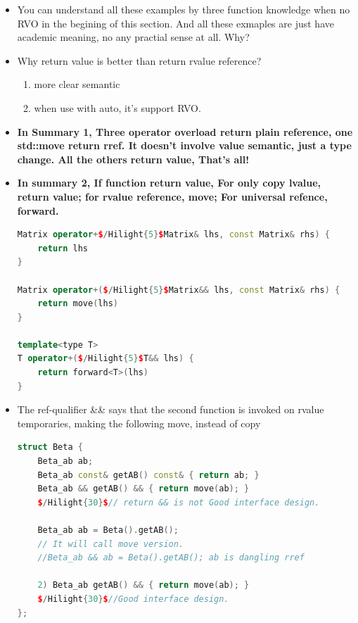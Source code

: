 \documentclass[a4paper,11pt,twoside]{book}
\begin{document}
\begin{itemize}
	
	\item You can understand all these examples by three function knowledge when no RVO in the begining of this section. And all these exmaples are just have academic meaning, no any practial sense at all. Why?

	
	\item Why return value is better than return rvalue reference?
	\begin{enumerate}
		\item more clear semantic 
		\item when use with auto, it's support RVO.
	\end{enumerate}


	
	\item \textbf{In Summary 1, Three operator overload return plain reference, one std::move return rref. It doesn't involve value semantic, just a type change. All the others return value, That's all!}
	
	\item \textbf{In summary 2, If function return value, For only copy lvalue, return value; for rvalue reference, move;  For universal refence, forward. }
	
\begin{lstlisting}[frame=single, language=c++,mathescape=true]
Matrix operator+$/Hilight{5}$Matrix& lhs, const Matrix& rhs) {
	return lhs
}
	
Matrix operator+($/Hilight{5}$Matrix&& lhs, const Matrix& rhs) {
	return move(lhs)
}
	
template<type T>
T operator+($/Hilight{5}$T&& lhs) {
	return forward<T>(lhs)
}
\end{lstlisting}
	
	\item The ref-qualifier \&\& says that the second function is invoked on rvalue temporaries, making the following move, instead of copy
	
\begin{lstlisting}[frame=single, language=c++,mathescape=true]
struct Beta {
	Beta_ab ab;
	Beta_ab const& getAB() const& { return ab; }
	Beta_ab && getAB() && { return move(ab); }
	$/Hilight{30}$// return && is not Good interface design.
	
	Beta_ab ab = Beta().getAB();
	// It will call move version.
	//Beta_ab && ab = Beta().getAB(); ab is dangling rref
	
	2) Beta_ab getAB() && { return move(ab); }
	$/Hilight{30}$//Good interface design.
};
\end{lstlisting}


\end{itemize}
\end{document}
